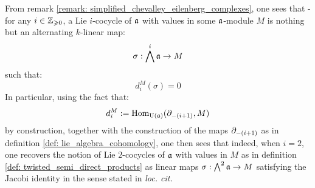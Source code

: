         \begin{remark}
            From remark \ref{remark: simplified_chevalley_eilenberg_complexes}, one sees that - for any $i \in \mathbb{Z}_{\geqslant 0}$, a Lie $i$-cocycle of $\mathfrak{a}$ with values in some $\mathfrak{a}$-module $M$ is nothing but an alternating $k$-linear map:
                $$\sigma: \bigwedge^i \mathfrak{a} \to M$$
            such that:
                $$d_i^M(\sigma) = 0$$
            In particular, using the fact that:
                $$d_i^M := \mathrm{Hom}_{\mathrm{U}(\mathfrak{a})}(\partial_{-(i + 1)}, M)$$
            by construction, together with the construction of the maps $\partial_{-(i + 1)}$ as in definition \ref{def: lie_algebra_cohomology}, one then sees that indeed, when $i = 2$, one recovers the notion of Lie $2$-cocycles of $\mathfrak{a}$ with values in $M$ as in definition \ref{def: twisted_semi_direct_products} as linear maps $\sigma: \bigwedge^2 \mathfrak{a} \to M$ satisfying the Jacobi identity in the sense stated in \textit{loc. cit.}
        \end{remark}
